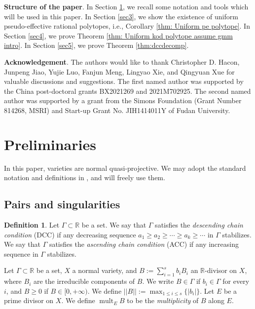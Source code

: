 \documentclass[11pt]{amsart}
\numberwithin{equation}{section}
\newcommand{\Rr}{\mathbb{R}}
\newcommand{\mult}{\operatorname{mult}}
\newcommand{\Ii}{{\Gamma}}
\theoremstyle{definition}
\theoremstyle{definition}
\newtheorem{defn}[thm]{Definition}
\begin{document}
\medskip

\noindent\textbf{Structure of the paper}. In Section \ref{sec2}, we recall some notation and tools which will be used in this paper. In Section \ref{sec3}, we show the existence of uniform pseudo-effective rational polytopes, i.e., Corollary \ref{thm: Uniform pe polytope}. In Section \ref{sec4}, we prove Theorem \ref{thm: Uniform kod polytope assume gmm intro}. In Section \ref{sec5}, we prove Theorem \ref{thm:dccdecomp}. 

\medskip

\noindent\textbf{Acknowledgement}.
The authors would like to thank Christopher D. Hacon, Junpeng Jiao, Yujie Luo, Fanjun Meng, Lingyao Xie, and Qingyuan Xue for valuable discussions and suggestions. The first named author was supported by the China post-doctoral grants BX2021269 and 2021M702925. The second named author was supported by a grant from the Simons Foundation (Grant Number 814268, MSRI) and Start-up Grant No. JIH1414011Y of Fudan University.

\section{Preliminaries}\label{sec2}
In this paper, varieties are normal quasi-projective. We may adopt the standard notation and definitions in \cite{KM98}, and will freely use them.

\subsection{Pairs and singularities}

\begin{defn}\label{defn: DCC and ACC}
Let $\Ii\subset\Rr$ be a set. We say that $\Ii$ satisfies the \emph{descending chain condition} (DCC) if any decreasing sequence $a_1\ge a_2 \ge \cdots \ge a_k \ge\cdots$ in $\Ii$ stabilizes. We say that $\Ii$ satisfies the \emph{ascending chain condition} (ACC) if any increasing sequence in $\Ii$ stabilizes. 
\end{defn}

Let $\Ii\subset\Rr$ be a set, $X$ a normal variety, and $B:=\sum_{i=1}^s b_iB_i$ an $\Rr$-divisor on $X$, where $B_i$ are the irreducible components of $B$. We write $B\in\Ii$ if $b_i\in\Ii$ for every $i$, and $B\geq 0$ if  $B\in [0,+\infty)$. We define $||B||:=\max_{1\leq i\leq s}\{|b_i|\}$. Let $E$ be a prime divisor on $X$. We define $\mult_EB$ to be the \emph{multiplicity} of $B$ along $E$. 
\end{document}
